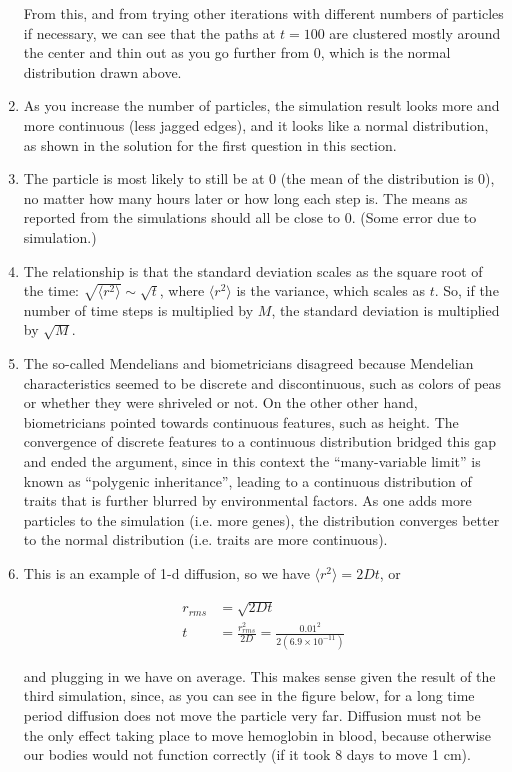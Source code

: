 \documentclass[12pt]{article}
\begin{document}
\begin{enumerate}
From this, and from trying other iterations with different numbers of particles if necessary, we can see that the paths at $t = 100$ are clustered mostly around the center and thin out as you go further from $0$, which is the normal distribution drawn above.
\item As you increase the number of particles, the simulation result looks more and more continuous (less jagged edges), and it looks like a normal distribution, as shown in the solution for the first question in this section.
\item The particle is most likely to still be at 0 (the mean of the distribution is 0), no matter how many hours later or how long each step is. The means as reported from the simulations should all be close to 0. (Some error due to simulation.)
\item The relationship is that the standard deviation scales as the square root of the time: $\sqrt{\langle r^2 \rangle} \sim \sqrt{t}$, where $\langle r^2 \rangle$ is the variance, which scales as $t$. So, if the number of time steps is multiplied by $M$, the standard deviation is multiplied by $\sqrt{M}$.
\item The so-called Mendelians and biometricians disagreed because Mendelian characteristics seemed to be discrete and discontinuous, such as colors of peas or whether they were shriveled or not. On the other other hand, biometricians pointed towards continuous features, such as height. The convergence of discrete features to a continuous distribution bridged this gap and ended the argument, since in this context the ``many-variable limit'' is known as ``polygenic inheritance'', leading to a continuous distribution of traits that is further blurred by environmental factors. As one adds more particles to the simulation (i.e. more genes), the distribution converges better to the normal distribution (i.e. traits are more continuous).
\item This is an example of 1-d diffusion, so we have $\langle r^2 \rangle = 2Dt$, or

\begin{align*}
r_{rms} &= \sqrt{2Dt}\\
t &= \frac{r_{rms}^2}{2D} = \frac{0.01^2}{2(6.9\times 10^{-11})}
\end{align*}

and plugging in we have  on average. This makes sense given the result of the third simulation, since, as you can see in the figure below, for a long time period diffusion does not move the particle very far. Diffusion must not be the only effect taking place to move hemoglobin in blood, because otherwise our bodies would not function correctly (if it took 8 days to move 1 cm).


\end{enumerate}
\end{document}

